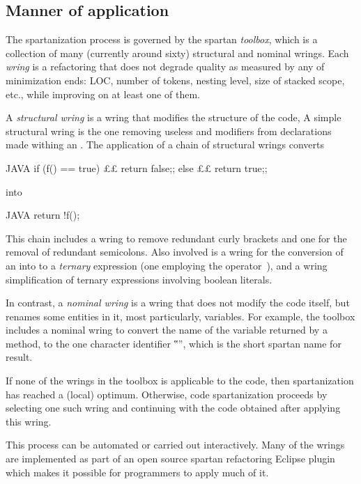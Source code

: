 \subsection{Manner of application}
\label{section:manner}
The spartanization process is governed by the spartan
\emph{toolbox}, which is a collection of many (currently around sixty)
structural and nominal wrings. Each \emph{wring} is a refactoring that does
not degrade quality as measured by any of minimization ends: LOC, number of
tokens, nesting level, size of stacked scope, etc., while improving on at least
one of them.

A \emph{structural wring} is a wring that modifies the structure of the code,
A simple structural wring is the one removing
useless  and  modifiers from
declarations made withing an .
The application of a chain of structural wrings converts
\begin{lcode}{JAVA}
if (f() == true) {££
  return false;;
} else {££
  return true;;
}
\end{lcode}
\noindent into
\begin{lcode}{JAVA}
return !f();
\end{lcode}
\noindent
This chain includes a wring to remove redundant curly brackets and one for the
removal of redundant semicolons.
Also involved is a wring for the conversion of an  into to a
\emph{ternary} expression (one employing the operator~), and a
wring simplification of ternary expressions involving boolean literals.

In contrast, a \emph{nominal wring} is a wring that does not modify the
code itself, but renames some entities in it, most particularly, variables.
For example, the toolbox includes a nominal wring to convert the name of the
variable returned by a method, to the one character identifier ‟\cc{\$}”,
which is the short spartan name for result.

If none of the wrings in the toolbox is applicable to the code, then
spartanization has reached a (local) optimum. Otherwise, code spartanization
proceeds by selecting one such wring and continuing with the code obtained
after applying this wring.

This process can be automated or carried out interactively. Many of the wrings
are implemented as part of an open source spartan refactoring Eclipse
plugin which
makes it possible for programmers to apply much of it.

